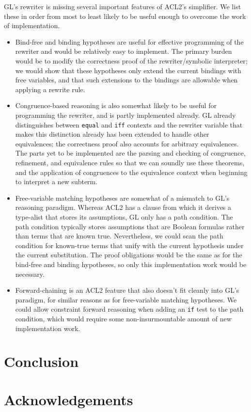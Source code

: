 \documentclass[submission,copyright,creativecommons]{eptcs}
\begin{document}
GL's rewriter is missing several important features of ACL2's
simplifier.  We list these in order from most to least likely to be
useful enough to overcome the work of implementation.
\begin{itemize}
\item Bind-free and binding hypotheses are useful for effective
  programming of the rewriter and would be relatively easy to
  implement.  The primary burden would be to modify the correctness
  proof of the rewriter/symbolic interpreter; we would show that these
  hypotheses only extend the current bindings with free variables, and
  that such extensions to the bindings are allowable when applying a
  rewrite rule.

\item Congruence-based reasoning is also somewhat likely to be useful
  for programming the rewriter, and is partly implemented already.  GL
  already distinguishes between \texttt{equal} and \texttt{iff}
  contexts and the rewriter variable that makes this distinction
  already has been extended to handle other equivalences; the
  correctness proof also accounts for arbitrary equivalences.  The
  parts yet to be implemented are the parsing and checking of
  congruence, refinement, and equivalence rules so that we can soundly
  use these theorems, and the application of congruences to the
  equivalence context when beginning to interpret a new subterm.

\item Free-variable matching hypotheses are somewhat of a mismatch to
  GL's reasoning paradigm.  Whereas ACL2 has a clause from which it
  derives a type-alist that stores its assumptions, GL only has a path
  condition.  The path condition typically stores assumptions that are
  Boolean formulas rather than terms that are known true.
  Nevertheless, we could scan the path condition for known-true terms
  that unify with the current hypothesis under the current
  substitution.  The proof obligations would be the same as for the
  bind-free and binding hypotheses, so only this implementation work
  would be necessary.

\item Forward-chaining is an ACL2 feature that also doesn't fit
  cleanly into GL's paradigm, for similar reasons as for free-variable
  matching hypotheses.  We could allow constraint  forward reasoning when adding
  an \texttt{if} test to the path condition, which would require some
  non-insurmountable amount of new implementation work.

\end{itemize}
\section{Conclusion}
\label{sec:conclusion}

\section*{Acknowledgements}



\end{document}
